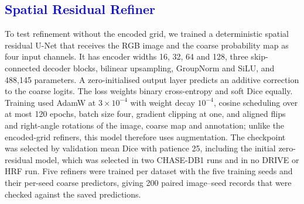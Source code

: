 \documentclass[jimaging,article,submit,pdftex,moreauthors]
  {Definitions/mdpi}
\DeclareRobustCommand{\rev}[1]{\textcolor{blue}{#1}}
\newcommand{\revbegin}{\begingroup\color{blue}}
\DeclareRobustCommand{\rev}[1]{#1}
\newcommand{\revbegin}{\begingroup}
\newcommand{\revend}{\ifhmode\par\fi\endgroup}
\providecommand{\linelabel}[1]{}
\newcommand{\seclabel}[1]{\linelabel{rev:sec:#1}}
\begin{document}
\subsection{\rev{Spatial Residual Refiner}}
\label{sec:spatial}
\seclabel{spatial}

\revbegin{}To test refinement without the encoded grid, we trained a deterministic spatial residual U-Net that receives the RGB image and the coarse probability map as four input channels. It has encoder widths 16, 32, 64 and 128, three skip-connected decoder blocks, bilinear upsampling, GroupNorm and SiLU, and 488,145 parameters. A zero-initialised output layer predicts an additive correction to the coarse logits. The loss weights binary cross-entropy and soft Dice equally. Training used AdamW at $3\times10^{-4}$ with weight decay $10^{-4}$, cosine scheduling over at most 120 epochs, batch size four, gradient clipping at one, and aligned flips and right-angle rotations of the image, coarse map and annotation; unlike the encoded-grid refiners, this model therefore uses augmentation. The checkpoint was selected by validation mean Dice with patience 25, including the initial zero-residual model, which was selected in two CHASE-DB1 runs and in no DRIVE or HRF run. Five refiners were trained per dataset with the five training seeds and their per-seed coarse predictors, giving 200 paired image--seed records that were checked against the saved predictions.

\begin{table}[htbp]\revbegin{}
\centering
\caption{Spatial residual refiner versus coarse LU-Net+RA on the same test images. Entries are mean $\pm$ sample SD across five training-seed means. Difference is refined minus coarse; intervals are crossed-bootstrap 95\% intervals (50,000 draws). Probabilities are Holm-adjusted across the three datasets, separately for paired $t$ ($p_t$) and exact signed-rank ($p_W$) tests.}
\label{tab:spatial}
\small
{}
\revend{}\end{table}
\end{document}
